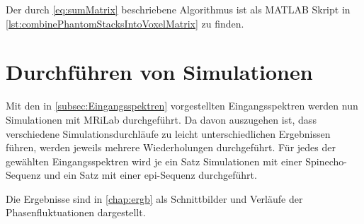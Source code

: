 Der durch \autoref{eq:sumMatrix} beschriebene Algorithmus ist als MATLAB Skript in \autoref{lst:combinePhantomStacksIntoVoxelMatrix} zu finden.

\section{Durchführen von Simulationen}
Mit den in \autoref{subsec:Eingangsspektren} vorgestellten Eingangsspektren werden nun Simulationen mit MRiLab durchgeführt. Da davon auszugehen ist, dass verschiedene Simulationsdurchläufe zu leicht unterschiedlichen Ergebnissen führen, werden jeweils mehrere Wiederholungen durchgeführt. Für jedes der gewählten Eingangsspektren wird je ein Satz Simulationen mit einer Spinecho-Sequenz und ein Satz mit einer \gls{epi}-Sequenz durchgeführt.

Die Ergebnisse sind in \autoref{chap:ergb} als Schnittbilder und Verläufe der Phasenfluktuationen dargestellt.










